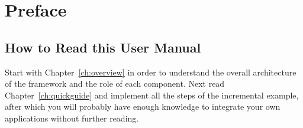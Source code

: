 {%
}

\chapter*{Preface}

\section*{How to Read this User Manual}

Start with Chapter~\ref{ch:overview} in order to understand the
overall architecture of the \ei framework and the role of each
component. 
%
Next read Chapter~\ref{ch:quickguide} and implement all the steps of
the incremental example, after which you will probably have enough
knowledge to integrate your own applications without further reading.
